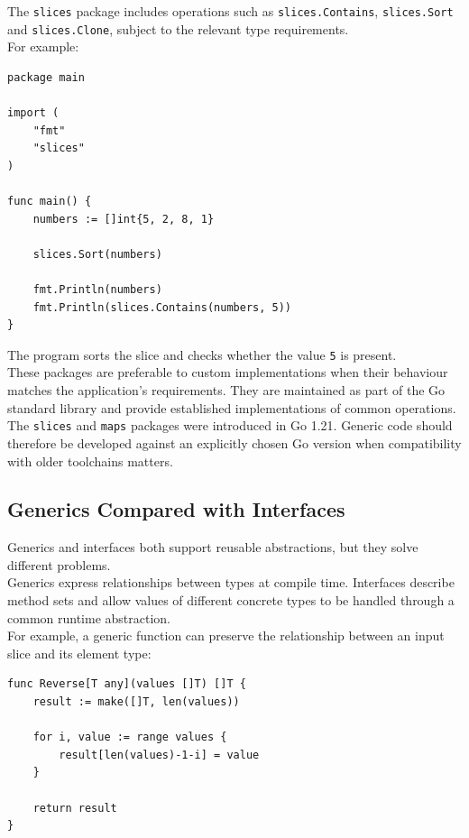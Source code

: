 The \texttt{slices} package includes operations such as \texttt{slices.Contains}, \texttt{slices.Sort} and \texttt{slices.Clone}, subject to the relevant type requirements.\\

For example:

\begin{lstlisting}
package main

import (
    "fmt"
    "slices"
)

func main() {
    numbers := []int{5, 2, 8, 1}

    slices.Sort(numbers)

    fmt.Println(numbers)
    fmt.Println(slices.Contains(numbers, 5))
}
\end{lstlisting}

The program sorts the slice and checks whether the value \texttt{5} is present.\\

These packages are preferable to custom implementations when their behaviour matches the application's requirements. They are maintained as part of the Go standard library and provide established implementations of common operations.\\

The \texttt{slices} and \texttt{maps} packages were introduced in Go 1.21. Generic code should therefore be developed against an explicitly chosen Go version when compatibility with older toolchains matters.\\

\subsection{Generics Compared with Interfaces}

Generics and interfaces both support reusable abstractions, but they solve different problems.\\

Generics express relationships between types at compile time. Interfaces describe method sets and allow values of different concrete types to be handled through a common runtime abstraction.\\

For example, a generic function can preserve the relationship between an input slice and its element type:

\begin{lstlisting}
func Reverse[T any](values []T) []T {
    result := make([]T, len(values))

    for i, value := range values {
        result[len(values)-1-i] = value
    }

    return result
}
\end{lstlisting}

